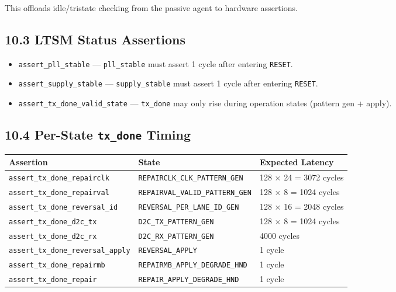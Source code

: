 \documentclass[11pt,a4paper]{article}
\begin{document}
This offloads idle/tristate checking from the passive agent to hardware assertions.

\subsection{10.3 LTSM Status Assertions}

\begin{itemize}
  \item \texttt{assert\_pll\_stable} --- \texttt{pll\_stable} must assert 1 cycle after entering \texttt{RESET}.
  \item \texttt{assert\_supply\_stable} --- \texttt{supply\_stable} must assert 1 cycle after entering \texttt{RESET}.
  \item \texttt{assert\_tx\_done\_valid\_state} --- \texttt{tx\_done} may only rise during operation states (pattern gen + apply).
\end{itemize}


\subsection{10.4 Per-State \texttt{tx\_done} Timing}


\begin{tabularx}{\textwidth}{|X|X|X|}
\hline
\textbf{Assertion} & \textbf{State} & \textbf{Expected Latency} \\
\hline
\texttt{assert\_tx\_done\_repairclk} & \texttt{REPAIRCLK\_CLK\_PATTERN\_GEN} & 128 $\times$ 24 = 3072 cycles \\
\hline
\texttt{assert\_tx\_done\_repairval} & \texttt{REPAIRVAL\_VALID\_PATTERN\_GEN} & 128 $\times$ 8 = 1024 cycles \\
\hline
\texttt{assert\_tx\_done\_reversal\_id} & \texttt{REVERSAL\_PER\_LANE\_ID\_GEN} & 128 $\times$ 16 = 2048 cycles \\
\hline
\texttt{assert\_tx\_done\_d2c\_tx} & \texttt{D2C\_TX\_PATTERN\_GEN} & 128 $\times$ 8 = 1024 cycles \\
\hline
\texttt{assert\_tx\_done\_d2c\_rx} & \texttt{D2C\_RX\_PATTERN\_GEN} & 4000 cycles \\
\hline
\texttt{assert\_tx\_done\_reversal\_apply} & \texttt{REVERSAL\_APPLY} & 1 cycle \\
\hline
\texttt{assert\_tx\_done\_repairmb} & \texttt{REPAIRMB\_APPLY\_DEGRADE\_HND} & 1 cycle \\
\hline
\texttt{assert\_tx\_done\_repair} & \texttt{REPAIR\_APPLY\_DEGRADE\_HND} & 1 cycle \\
\hline
\end{tabularx}
\end{document}
